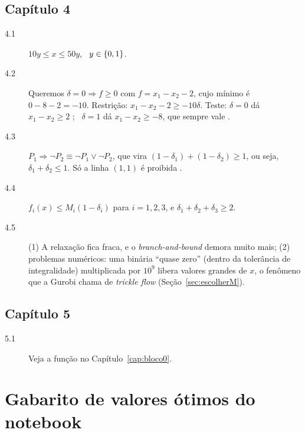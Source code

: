 \section*{Capítulo 4}
\begin{description}
  \item[4.1] $10y\le x\le50y$, \ $y\in\{0,1\}$.
  \item[4.2] Queremos $\delta=0\Rightarrow f\ge0$ com $f=x_1-x_2-2$, cujo mínimo é $0-8-2=-10$. Restrição:
  $x_1-x_2-2\ge-10\delta$. Teste: $\delta=0$ dá $x_1-x_2\ge2$ \checkmark; \ $\delta=1$ dá $x_1-x_2\ge-8$, que sempre
  vale \checkmark.
  \item[4.3] $P_1\Rightarrow\neg P_2\equiv\neg P_1\vee\neg P_2$, que vira $(1-\delta_1)+(1-\delta_2)\ge1$, ou seja,
  $\delta_1+\delta_2\le1$. Só a linha $(1,1)$ é proibida \checkmark.
  \item[4.4] $f_i(x)\le M_i(1-\delta_i)$ para $i=1,2,3$, e $\delta_1+\delta_2+\delta_3\ge2$.
  \item[4.5] (1) A relaxação fica fraca, e o \emph{branch-and-bound} demora muito mais; (2) problemas numéricos: uma
  binária ``quase zero'' (dentro da tolerância de integralidade) multiplicada por $10^9$ libera valores grandes de
  $x$, o fenômeno que a Gurobi chama de \emph{trickle flow} (Seção~\ref{sec:escolherM}).
\end{description}

\section*{Capítulo 5}
\begin{description}
  \item[5.1] Veja a função  no Capítulo~\ref{cap:bloco0}.
\end{description}

\chapter{Gabarito de valores ótimos do notebook}

